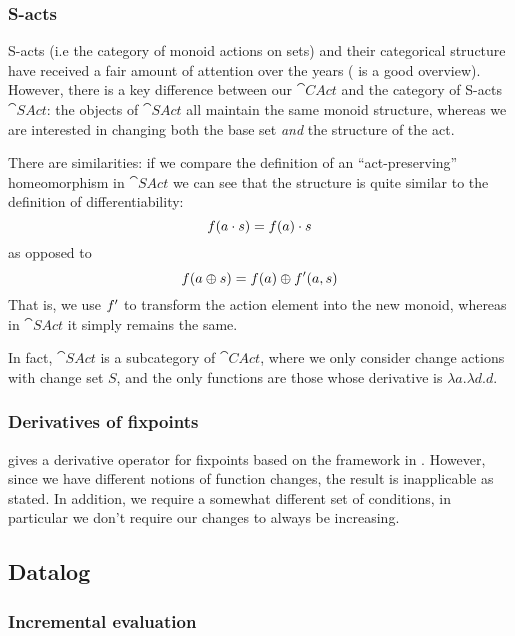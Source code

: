 \subsubsection{S-acts}
\label{sec:sacts}

S-acts (i.e the category of monoid actions on sets) and their categorical structure have received a fair amount of attention
over the years (\textcite{kilp2000monoids} is a good
overview). However, there is a key difference between our $\cat{CAct}$ and the category of
S-acts $\cat{SAct}$: the objects of $\cat{SAct}$ all maintain the same monoid
structure, whereas we are interested in changing both the base set \emph{and} the structure of the act.

There are similarities: if we compare the definition of an ``act-preserving''
homeomorphism in $\cat{SAct}$ \autocite[see][]{kilp2000monoids} we can see that the structure is
quite similar to the definition of differentiability:
\begin{displaymath}
  f(a \cdot s) = f(a) \cdot s
\end{displaymath}
as opposed to
\begin{displaymath}
  f(a \oplus s) = f(a) \oplus f'(a, s)
\end{displaymath}
That is, we use $f'$ to transform the action element into the new
monoid, whereas in $\cat{SAct}$ it simply remains the same.

In fact, $\cat{SAct}$ is a subcategory of $\cat{CAct}$, where we only
consider change actions with change set $S$, and the only functions are those
whose derivative is $\lambda a. \lambda d. d$.

\subsubsection{Derivatives of fixpoints}

\textcite{arntz2017fixpoints} gives a derivative operator for fixpoints based on
the framework in \textcite{cai2014changes}. However, since we have different
notions of function changes, the result is inapplicable as
stated. In addition, we require a somewhat different set of conditions, in particular we
don't require our changes to always be increasing.

\subsection{Datalog}

\subsubsection{Incremental evaluation}

